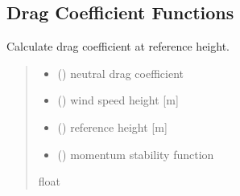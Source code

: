 \documentclass[letterpaper,10pt,english]{sphinxmanual}
\begin{document}
\subsection{Drag Coefficient Functions}
\label{\detokenize{users_guide:module-flux_subs}}\label{\detokenize{users_guide:drag-coefficient-functions}}

\begin{fulllineitems}
\label{\detokenize{users_guide:flux_subs.cd_calc}}
\pysigstartsignatures
{}
\pysigstopsignatures
\sphinxAtStartPar
Calculate drag coefficient at reference height.
\begin{quote}\begin{description}
\begin{itemize}
\item {} 
\sphinxAtStartPar
{} () \textendash{} neutral drag coefficient

\item {} 
\sphinxAtStartPar
{} () \textendash{} wind speed height       {[}m{]}

\item {} 
\sphinxAtStartPar
{} () \textendash{} reference height        {[}m{]}

\item {} 
\sphinxAtStartPar
{} () \textendash{} momentum stability function

\end{itemize}

\sphinxAtStartPar
{}

\sphinxAtStartPar
float

\end{description}\end{quote}

\end{fulllineitems}
\end{document}
